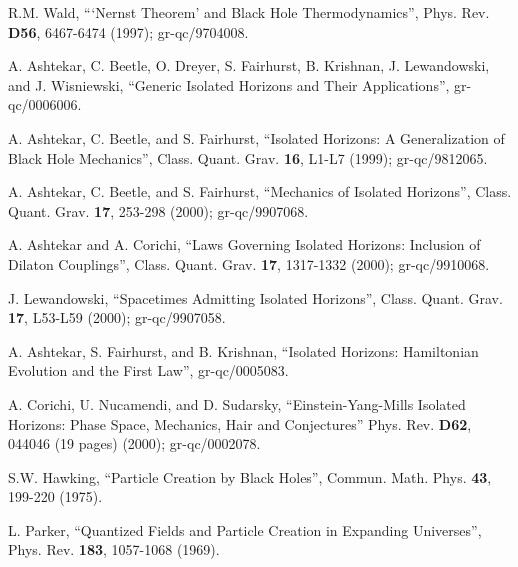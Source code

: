 \begin{thebibliography}{999}
 R.M. Wald, ```Nernst Theorem' and Black
Hole Thermodynamics'', Phys. Rev. {\bf D56}, 6467-6474 (1997);
gr-qc/9704008.  

 A. Ashtekar, C. Beetle, O. Dreyer,
S. Fairhurst, B. Krishnan, J. Lewandowski, and J. Wisniewski,
``Generic Isolated Horizons and Their Applications'', gr-qc/0006006.

 A. Ashtekar, C. Beetle, and
S. Fairhurst, ``Isolated Horizons: A Generalization of Black Hole
Mechanics'', Class. Quant. Grav. {\bf 16}, L1-L7 (1999);
gr-qc/9812065.  

 A. Ashtekar, C. Beetle, and
S. Fairhurst, ``Mechanics of Isolated Horizons'',
Class. Quant. Grav. {\bf 17}, 253-298 (2000); gr-qc/9907068.

 A. Ashtekar and A. Corichi, ``Laws
Governing Isolated Horizons: Inclusion of Dilaton Couplings'',
Class. Quant. Grav. {\bf 17}, 1317-1332 (2000); gr-qc/9910068.

 J. Lewandowski, ``Spacetimes Admitting
Isolated Horizons'', Class. Quant. Grav. {\bf 17}, L53-L59 (2000);
gr-qc/9907058.  

 A. Ashtekar, S. Fairhurst, and
B. Krishnan, ``Isolated Horizons: Hamiltonian Evolution and the First
Law'', gr-qc/0005083.  

 A. Corichi, U. Nucamendi, and
D. Sudarsky, ``Einstein-Yang-Mills Isolated Horizons: Phase Space,
Mechanics, Hair and Conjectures'' Phys. Rev. {\bf D62}, 044046 (19
pages) (2000); gr-qc/0002078.  

 S.W. Hawking, ``Particle Creation by
Black Holes'', Commun. Math. Phys. {\bf 43}, 199-220 (1975).

 L. Parker, ``Quantized Fields and Particle Creation in
Expanding Universes'', Phys. Rev. {\bf 183}, 1057-1068 (1969).


\end{thebibliography}
